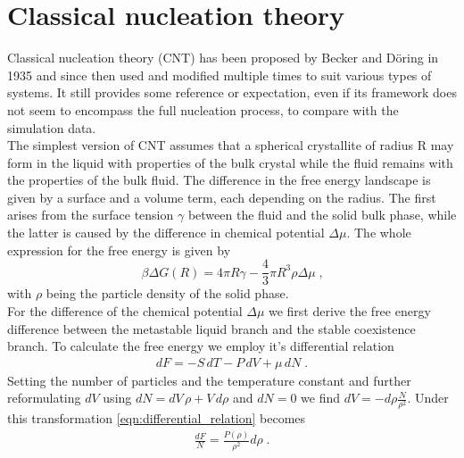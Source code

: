 
\section{Classical nucleation theory }
\label{sec:CNT}
Classical nucleation theory (CNT) has been proposed by Becker and Döring in 1935\cite{Becker1935} and since then used and modified multiple times to suit various types of systems. It still provides some reference or expectation, even if its framework does not seem to encompass the full nucleation process, to compare with the simulation data.\\

The simplest version of CNT assumes that a spherical crystallite of radius R may form in the liquid with properties of the bulk crystal while the fluid remains with the properties of the bulk fluid. The difference in the free energy landscape is given by a surface and a volume term, each depending on the radius. The first arises from the surface tension $\gamma$ between the fluid and the solid bulk phase, while the latter is caused by the difference in chemical potential $\Delta \mu$. The whole expression for the free energy is given by
\begin{equation}
\label{eqn:free_energy}
\beta \Delta G(R) =4 \pi R \gamma -\frac{4}{3} \pi R^3 \rho \Delta \mu  \; \text{,}
\end{equation}
with $\rho$ being the particle density of the solid phase.\\

For the difference of the chemical potential $\Delta \mu $ we first derive the free energy difference between the metastable liquid branch and the stable coexistence branch. To calculate the free energy we employ it's differential relation
\begin{align}
\label{eqn:differential_relation}
dF = -S  \, dT -P \, dV + \mu  \, dN \; \text{.}
\end{align}
Setting the number of particles and the temperature constant and further reformulating $dV$ using \linebreak[1] $dN = dV  \, \rho + V  \, d\rho  $ and $dN = 0 $ we find $ dV = -d\rho \frac{N}{\rho^2}$. Under this transformation \autoref{eqn:differential_relation} becomes
\begin{align}
\label{eqn:df_relation}
\frac{dF}{N} = \frac{P(\rho)}{\rho^2} d\rho \; \text{.}
\end{align}

